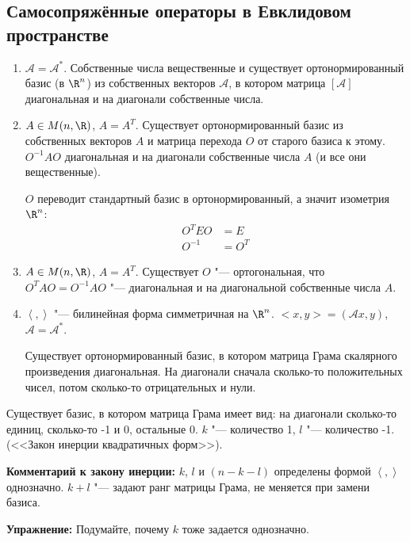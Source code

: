 \subsection{Самосопряжённые операторы в Евклидовом пространстве}

\begin{enumerate}
\item
	$\mathcal A = \mathcal{A}^*$.
	Собственные числа вещественные и существует ортонормированный базис (в $\R^n$) из собственных векторов $\mathcal A$,
	в котором матрица $[\mathcal A]$ диагональная и на диагонали собственные числа.

\item
	$A \in M(n, \R)$, $A = A^T$.
	Существует ортонормированный базис из собственных векторов $A$ и матрица перехода $O$ от старого базиса к этому.
	$O^{-1}AO$ диагональная и на диагонали собственные числа $A$ (и все они вещественные).

	$O$ переводит стандартный базис в ортонормированный, а значит изометрия $\R^n$:
	\begin{align*}
		O^T E O &= E \\
		O^{-1}  &= O^T
	\end{align*}

\item
	$A \in M(n,\R)$, $A = A^T$.
	Существует $O$ "--- ортогональная, что $O^TAO = O^{-1}AO$ "--- диагональная и на диагональной собственные числа $A$.

\item
	$\left<,\right>$ "--- билинейная форма симметричная на $\R^n$.
	$<x, y> = (\mathcal Ax, y)$, $\mathcal A = \mathcal{A}^*$.

	Существует ортонормированный базис, в котором матрица Грама скалярного произведения диагональная.
	На диагонали сначала сколько-то положительных чисел, потом сколько-то отрицательных и нули.
\end{enumerate}

\begin{conseq}
	Существует базис, в котором матрица Грама имеет вид: на диагонали сколько-то единиц, сколько-то -1 и 0, остальные 0.
	$k$ "--- количество 1, $l$ "--- количество -1.
	(<<Закон инерции квадратичных форм>>).
\end{conseq}

\textbf{Комментарий к закону инерции:}
$k$, $l$ и $(n - k - l)$ определены формой $\left<,\right>$ однозначно.
$k + l$ "--- задают ранг матрицы Грама, не меняется при замени базиса.

\textbf{Упражнение:}
Подумайте, почему $k$ тоже задается однозначно.
